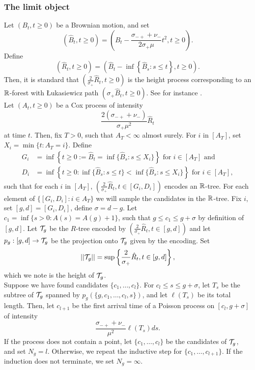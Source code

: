 \subsubsection{The limit object}\label{subsubsec.samplecontinuousobject}
Let $(B_t,t\geq 0)$ be a Brownian motion, and set $$\left(\hat{B}_t,t\geq 0\right)=\left(B_t-\frac{\sigma_{-+}+\nu_-}{2\sigma_+\mu}t^2,t\geq 0\right).$$
Define 
$$(\hat{R}_t,t\geq 0)= \left(\hat{B}_t-\inf\left\{\hat{B}_s: s\leq t\right\},t\geq 0\right).$$
Then, it is standard that $\left(\frac{2}{\sigma_+}\hat{R}_t,t\geq 0\right)$ is the height process corresponding to an ${\mathbb R}$-forest with \L ukasiewicz path $\left(\sigma_+\hat{B}_t,t\geq 0\right)$. See for instance \cite{AddarioBerry2010}. \\
Let $(A_t,t\geq 0)$ be a Cox process of intensity $$\frac{2(\sigma_{-+}+\nu_-)}{\sigma_+\mu^2} \hat{R}_t$$ at time $t$. Then, fix $T>0$, such that $A_T<\infty$ almost surely. For $i$ in $\left[A_T\right]$, set $X_i=\min\{t:A_T=i\}$. Define
\begin{align*}
G_i&=\inf\left\{t\geq 0:=\hat{B}_t=\inf\{\hat{B}_s:s\leq X_i\}\right\}\text{ for }i\in \left[A_T\right]\text{ and}\\
D_i&=\inf\left\{ t\geq 0: \inf\{\hat{B}_s:s\leq t\} < \inf\{\hat{B}_s:s\leq X_i\}\right\}\text{ for }i\in \left[A_T\right],
\end{align*}
such that for each $i$ in $\left[A_T\right]$, $\left(\frac{2}{\sigma_+}\hat{R}_t,t\in [G_i,D_i]\right)$ encodes an ${\mathbb R}$-tree. For each element of $\{[G_i,D_i]:i\in A_T\}$ we will sample the candidates in the ${\mathbb R}$-tree. Fix $i$, set $[g,d]=[G_i,D_i]$, define $\sigma=d-g$. Let $c_1=\inf\{s>0:A(s)=A(g)+1\}$, such that $g\leq c_1\leq g+\sigma$ by definition of $[g,d]$. Let ${\mathcal T}_g$ be the $R$-tree encoded by $\left(\frac{2}{\sigma_+}\hat{R}_t,t\in [g,d]\right)$ and let $p_g:[g,d]\to {\mathcal T}_g$ be the projection onto ${\mathcal T}_g$ given by the encoding. Set $$||{\mathcal T}_g||=\sup\left\{\frac{2}{\sigma_+}\hat{R}_t,t\in [g,d]\right\},$$
which we note is the height of ${\mathcal T}_g$. \\
Suppose we have found candidates $\{c_1,\dots,c_l\}$. For $c_l\leq s\leq g+\sigma$, let $T_s$ be the subtree of ${\mathcal T}_g$ spanned by $p_g\left(\{g,c_1,\dots,c_l,s\}\right)$, and let $\ell(T_s)$ be its total length. Then, let $c_{l+1}$ be the first arrival time of a Poisson process on $[c_l,g+\sigma]$ of intensity $$\frac{\sigma_{-+}+\nu_-}{\mu^2}\ell(T_s)ds.$$ If the process does not contain a point, let $\{c_1,\dots,c_l\}$ be the candidates of ${\mathcal T}_g$, and set $N_g=l$. Otherwise, we repeat the inductive step for $\{c_1,\dots,c_{l+1}\}.$ If the induction does not terminate, we set $N_g=\infty$.\\
